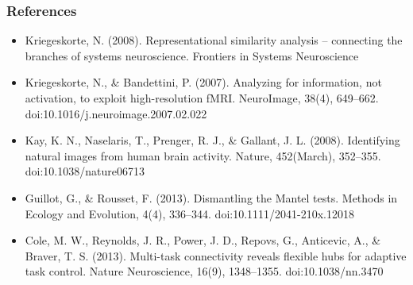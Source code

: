 \documentclass{beamer}
\begin{document}
\begin{frame}
\frametitle{References}
\begin{itemize}
\item Kriegeskorte, N. (2008). Representational similarity analysis – connecting the branches of systems neuroscience. Frontiers in Systems Neuroscience
\item Kriegeskorte, N., \& Bandettini, P. (2007). Analyzing for information, not activation, to exploit high-resolution fMRI. NeuroImage, 38(4), 649–662. doi:10.1016/j.neuroimage.2007.02.022
\item Kay, K. N., Naselaris, T., Prenger, R. J., \& Gallant, J. L. (2008). Identifying natural images from human brain activity. Nature, 452(March), 352–355. doi:10.1038/nature06713
\item Guillot, G., \& Rousset, F. (2013). Dismantling the Mantel tests. Methods in Ecology and Evolution, 4(4), 336–344. doi:10.1111/2041-210x.12018
\item Cole, M. W., Reynolds, J. R., Power, J. D., Repovs, G., Anticevic, A., \& Braver, T. S. (2013). Multi-task connectivity reveals flexible hubs for adaptive task control. Nature Neuroscience, 16(9), 1348–1355. doi:10.1038/nn.3470
\end{itemize}
\end{frame}
\end{document}
